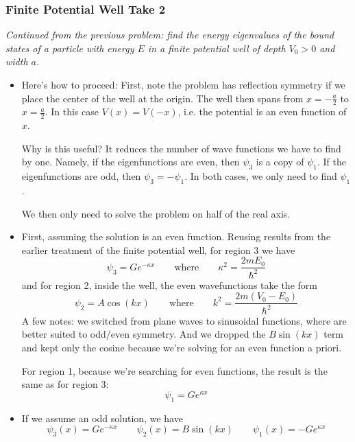 \documentclass[11pt, a4paper]{article}
\newcommand{\eqtext}[1]{\qquad \text{#1} \qquad}
\begin{document}
\subsubsection{Finite Potential Well Take 2}
\textit{Continued from the previous problem: find the energy eigenvalues of the bound states of a particle with energy $ E $ in a finite potential well of depth $ V_{0} > 0 $ and width $ a $.}
\begin{itemize}
	\item Here's how to proceed: First, note the problem has reflection symmetry if we place the center of the well at the origin. The well then spans from $ x = -\frac{a}{2} $ to $ x = \frac{a}{2} $. In this case $ V(x) = V(-x) $, i.e. the potential is an even function of $ x $. 
	
	Why is this useful? It reduces the number of wave functions we have to find by one. Namely, if the eigenfunctions are even, then $ \psi_{3} $ is a copy of $ \psi_{1} $. If the eigenfunctions are odd, then $ \psi_{3} = - \psi_{1} $. In both cases, we only need to find $ \psi_{1} $. 
	
	We then only need to solve the problem on half of the real axis.
	

		
	\item First, assuming the solution is an even function. Reusing results from the earlier treatment of the finite potential well, for region 3 we have
	\begin{equation*}
		\psi_{3} = Ge^{-\kappa x} \eqtext{where} \kappa^{2} = \frac{2mE_{0}}{\hbar^{2}}
	\end{equation*}
	and for region 2, inside the well, the even wavefunctions take the form
	\begin{equation*}
		\psi_{2} = A \cos(kx) \eqtext{where} k^{2} = \frac{2m(V_{0} - E_{0})}{\hbar^{2}}
	\end{equation*}
	A few notes: we switched from plane waves to sinusoidal functions, where are better suited to odd/even symmetry. And we dropped the $B\sin(kx)$ term and kept only the cosine because we're solving for an even function a priori.
	
	For region 1, because we're searching for even functions, the result is the same as for region 3:
	\begin{equation*}
		\psi_{1} = G e^{\kappa x}
	\end{equation*}
	
	\item If we assume an odd solution, we have
	\begin{equation*}
		\psi_{3}(x) = G e^{-\kappa x} \qquad \psi_{2}(x) = B \sin (kx) \qquad \psi_{1}(x) = -Ge^{\kappa x}
	\end{equation*}
	

\end{itemize}
\end{document}
